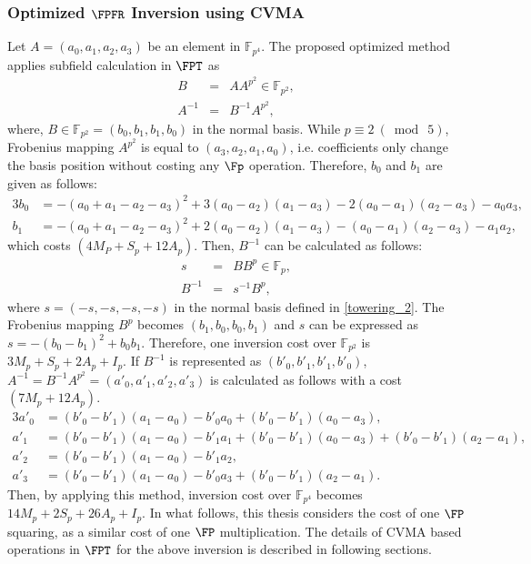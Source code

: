 \subsubsection{Optimized  $\FPFR$ Inversion using CVMA}
Let $A=(a_0,a_1,a_2,a_3)$ be an element in $\mathbb{F}_{p^4}$.
The proposed optimized method applies subfield calculation in $\FPT$ as 
\begin{eqnarray}
B&=&AA^{p^2} \in \mathbb{F}_{p^2}, \nonumber \\
A^{-1}&=&B^{-1}A^{p^2}, \nonumber
\end{eqnarray}
where, $B \in \mathbb{F}_{p^2} = (b_0,b_1,b_1,b_0)$ in the normal basis.
While $p \equiv 2~(\bmod~5)$,  Frobenius mapping $A^{p^2}$ is equal to $(a_3,a_2,a_1,a_0)$, i.e. coefficients only change the basis position without costing any $\Fp$ operation.
Therefore, $b_0$ and $b_1$ are given as follows: 
\begin{alignat}{3}
b_0 &=-(a_0+a_1-a_2-a_3)^2+3(a_0-a_2)(a_1-a_3)-2(a_0-a_1)(a_2-a_3)-a_0a_3, \nonumber \\
b_1 &=-(a_0+a_1-a_2-a_3)^2+2(a_0-a_2)(a_1-a_3) -(a_0-a_1)(a_2-a_3)-a_1a_2, \nonumber
\end{alignat}
which costs $(4M_P+S_p+12A_p)$.
Then, $B^{-1}$ can be calculated as follows:
\begin{eqnarray}
s&=&BB^{p} \in \mathbb{F}_p, \nonumber \\
B^{-1}&=&s^{-1}B^{p}, \nonumber
\end{eqnarray}
where $s = (-s,-s,-s,-s)$ in the normal basis defined in \eqref{towering_2}.
The Frobenius mapping $B^{p}$ becomes $(b_1,b_0,b_0,b_1)$ and $s$ can be expressed as $s=-(b_0-b_1)^2+b_0b_1$.
Therefore, one inversion cost over $\mathbb{F}_{p^2}$ is $3M_p+S_p+2A_p+I_p$.
If $B^{-1}$ is represented as $(b'_0,b'_1,b'_1,b'_0)$, $A^{-1}=B^{-1}A^{p^2}=(a'_0,a'_1,a'_2,a'_3)$ is calculated as follows with a cost $(7M_p+12A_p)$.
\begin{alignat}{3}
a'_0 &= (b'_0-b'_1)(a_1-a_0)-b'_0a_0+(b'_0-b'_1)(a_0-a_3), \nonumber \\
a'_1 &=(b'_0-b'_1)(a_1-a_0)-b'_1a_1+(b'_0-b'_1)(a_0-a_3)+(b'_0-b'_1)(a_2-a_1), \nonumber \\
a'_2 &= (b'_0-b'_1)(a_1-a_0)-b'_1a_2, \nonumber \\
a'_3 &=(b'_0-b'_1)(a_1-a_0)-b'_0a_3+(b'_0-b'_1)(a_2-a_1). \nonumber
\end{alignat}
Then, by applying this method, inversion cost over $\mathbb{F}_{p^4}$ becomes $14M_p+2S_p+26A_p+I_p$. 
In what follows, this thesis considers the cost of one $\FP$ squaring, as a similar cost of one $\FP$ multiplication.
The details of CVMA based operations in $\FPT$ for the above inversion is described in following sections.

